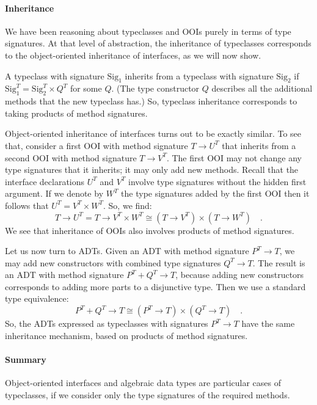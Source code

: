 \paragraph{Inheritance}

We have been reasoning about typeclasses and OOIs purely in terms
of type signatures. At that level of abstraction, the inheritance
of typeclasses corresponds to the object-oriented inheritance of interfaces,
as we will now show. 

A typeclass with signature $\text{Sig}_{1}$ inherits from a typeclass
with signature $\text{Sig}_{2}$ if $\text{Sig}_{1}^{T}=\text{Sig}_{2}^{T}\times Q^{T}$
for some $Q$. (The type constructor $Q$ describes all the additional
methods that the new typeclass has.) So, typeclass inheritance corresponds
to taking products of method signatures. 

Object-oriented inheritance of interfaces turns out to be exactly
similar. To see that, consider a first OOI with method signature $T\rightarrow U^{T}$
that inherits from a second OOI with method signature $T\rightarrow V^{T}$.
The first OOI may not change any type signatures that it inherits;
it may only add new methods. Recall that the interface declarations
$U^{T}$ and $V^{T}$ involve type signatures without the hidden first
argument. If we denote by $W^{T}$ the type signatures added by the
first OOI then it follows that $U^{T}=V^{T}\times W^{T}$. So, we
find:
\[
T\rightarrow U^{T}=T\rightarrow V^{T}\times W^{T}\cong(T\rightarrow V^{T})\times(T\rightarrow W^{T})\quad.
\]
We see that inheritance of OOIs also involves products of method signatures.

Let us now turn to ADTs. Given an ADT with method signature $P^{T}\rightarrow T$,
we may add new constructors with combined type signatures $Q^{T}\rightarrow T$.
The result is an ADT with method signature $P^{T}+Q^{T}\rightarrow T$,
because adding new constructors corresponds to adding more parts to
a disjunctive type. Then we use a standard type equivalence:
\[
P^{T}+Q^{T}\rightarrow T\cong(P^{T}\rightarrow T)\times(Q^{T}\rightarrow T)\quad.
\]
So, the ADTs expressed as typeclasses with signatures $P^{T}\rightarrow T$
have the same inheritance mechanism, based on products of method signatures.

\paragraph{Summary}

Object-oriented interfaces and algebraic data types are particular
cases of typeclasses, if we consider only the type signatures of the
required methods.

